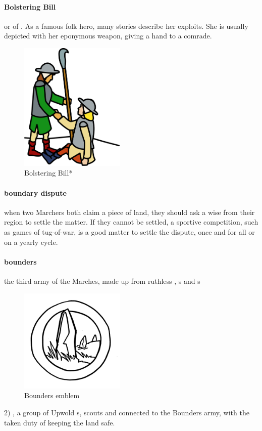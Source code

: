 \paragraph{Bolstering Bill} or   of . As a famous folk hero, many stories describe her exploits. She is usually depicted with her eponymous weapon, giving a hand to a comrade.\begin{figure} \centering \includegraphics[width=5cm]{encyclopedia/Wilhelmina} \caption{Bolstering Bill*}\end{figure}
\paragraph{boundary dispute} when two Marchers both claim a piece of land, they should ask a wise  from their region to settle the matter. If they cannot be settled, a sportive competition, such as games of tug-of-war, is a good matter to settle the dispute, once and for all or on a yearly cycle.
\paragraph{bounders}  the third army of the Marches, made up from ruthless  , s and s \begin{figure}\centering\includegraphics[width=5cm]{encyclopedia/TheBounders}\caption{Bounders emblem}\end{figure} 2) , a group of Upwold s, scouts and  connected to the Bounders army, with the taken duty of keeping the land safe.
